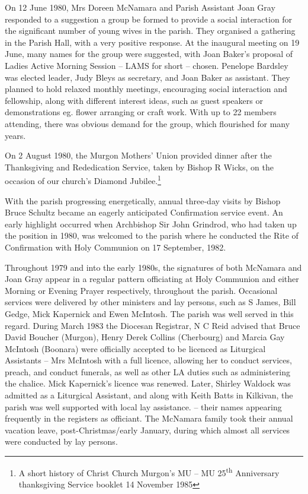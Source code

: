 On 12 June 1980, Mrs Doreen McNamara and Parish Assistant Joan Gray responded to a suggestion a group be formed to provide a social interaction for the significant number of young wives in the parish. They organised a gathering in the Parish Hall, with a very positive response. At the inaugural meeting on 19 June, many names for the group were suggested, with Joan Baker's proposal of Ladies Active Morning Session -- LAMS for short -- chosen. Penelope Bardsley was elected leader, Judy Bleys as secretary, and Joan Baker as assistant. They planned to hold relaxed monthly meetings, encouraging social interaction and fellowship, along with different interest ideas, such as guest speakers or demonstrations eg. flower arranging or craft work. With up to 22 members attending, there was obvious demand for the group, which flourished for many years.



On 2 August 1980, the Murgon Mothers' Union provided dinner after the Thanksgiving and Rededication Service, taken by Bishop R Wicks, on the occasion of our church's Diamond Jubilee.\footnote{A short history of Christ Church Murgon's MU -- MU 25\textsuperscript{th} Anniversary thanksgiving Service booklet 14 November 1985}


With the parish progressing energetically, annual three-day visits by Bishop Bruce Schultz became an eagerly anticipated Confirmation service event. An early highlight occurred when Archbishop Sir John Grindrod, who had taken up the position in 1980, was welcomed to the parish where he conducted the Rite of Confirmation with Holy Communion on 17 September, 1982.



Throughout 1979 and into the early 1980s, the signatures of both McNamara and Joan Gray appear in a regular pattern officiating at Holy Communion and either Morning or Evening Prayer respectively, throughout the parish. Occasional services were delivered by other ministers and lay persons, such as S James, Bill Gedge, Mick Kapernick and Ewen McIntosh. The parish was well served in this regard. During March 1983 the Diocesan Registrar, N C Reid advised that Bruce David Boucher (Murgon), Henry Derek Collins (Cherbourg) and Marcia Gay McIntosh (Boonara) were officially accepted to be licenced as Liturgical Assistants -- Mrs McIntosh with a full licence, allowing her to conduct services, preach, and conduct funerals, as well as other LA duties such as administering the chalice. Mick Kapernick's licence was renewed. Later, Shirley Waldock was admitted as a Liturgical Assistant, and along with Keith Batts in Kilkivan, the parish was well supported with local lay assistance. -- their names appearing frequently in the registers as officiant. The McNamara family took their annual vacation leave, post-Christmas/early January, during which almost all services were conducted by lay persons.



